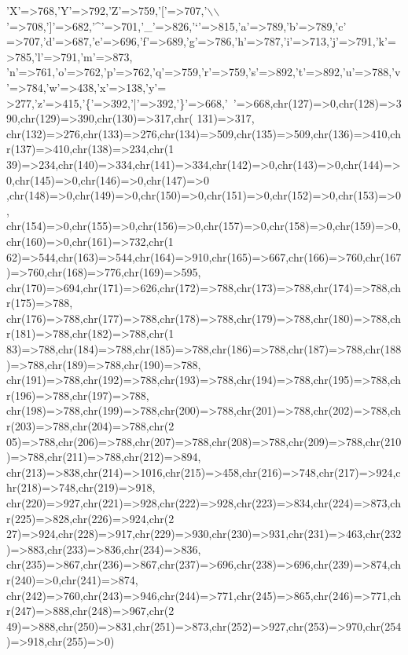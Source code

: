 \begin{DoxyCode}
    \textcolor{charliteral}{'X'}=>768,\textcolor{charliteral}{'Y'}=>792,\textcolor{charliteral}{'Z'}=>759,\textcolor{charliteral}{'['}=>707,\textcolor{charliteral}{'\(\backslash\)\(\backslash\)'}=>708,\textcolor{charliteral}{']'}=>682,\textcolor{charliteral}{'^'}=>701,\textcolor{charliteral}{'\_'}=>826,\textcolor{charliteral}{'`'}=>815,\textcolor{charliteral}{'a'}=>789,\textcolor{charliteral}{'b'}=>789,\textcolor{charliteral}{'c'}
      =>707,\textcolor{charliteral}{'d'}=>687,\textcolor{charliteral}{'e'}=>696,\textcolor{charliteral}{'f'}=>689,\textcolor{charliteral}{'g'}=>786,\textcolor{charliteral}{'h'}=>787,\textcolor{charliteral}{'i'}=>713,\textcolor{charliteral}{'j'}=>791,\textcolor{charliteral}{'k'}=>785,\textcolor{charliteral}{'l'}=>791,\textcolor{charliteral}{'m'}=>873,
    \textcolor{charliteral}{'n'}=>761,\textcolor{charliteral}{'o'}=>762,\textcolor{charliteral}{'p'}=>762,\textcolor{charliteral}{'q'}=>759,\textcolor{charliteral}{'r'}=>759,\textcolor{charliteral}{'s'}=>892,\textcolor{charliteral}{'t'}=>892,\textcolor{charliteral}{'u'}=>788,\textcolor{charliteral}{'v'}=>784,\textcolor{charliteral}{'w'}=>438,\textcolor{charliteral}{'x'}=>138,\textcolor{charliteral}{'y'}=
      >277,\textcolor{charliteral}{'z'}=>415,\textcolor{charliteral}{'\{'}=>392,\textcolor{charliteral}{'|'}=>392,\textcolor{charliteral}{'\}'}=>668,\textcolor{charliteral}{'~'}=>668,chr(127)=>0,chr(128)=>390,chr(129)=>390,chr(130)=>317,chr(
      131)=>317,
    chr(132)=>276,chr(133)=>276,chr(134)=>509,chr(135)=>509,chr(136)=>410,chr(137)=>410,chr(138)=>234,chr(1
      39)=>234,chr(140)=>334,chr(141)=>334,chr(142)=>0,chr(143)=>0,chr(144)=>0,chr(145)=>0,chr(146)=>0,chr(147)=>0
      ,chr(148)=>0,chr(149)=>0,chr(150)=>0,chr(151)=>0,chr(152)=>0,chr(153)=>0,
    chr(154)=>0,chr(155)=>0,chr(156)=>0,chr(157)=>0,chr(158)=>0,chr(159)=>0,chr(160)=>0,chr(161)=>732,chr(1
      62)=>544,chr(163)=>544,chr(164)=>910,chr(165)=>667,chr(166)=>760,chr(167)=>760,chr(168)=>776,chr(169)=>595,
      chr(170)=>694,chr(171)=>626,chr(172)=>788,chr(173)=>788,chr(174)=>788,chr(175)=>788,
    chr(176)=>788,chr(177)=>788,chr(178)=>788,chr(179)=>788,chr(180)=>788,chr(181)=>788,chr(182)=>788,chr(1
      83)=>788,chr(184)=>788,chr(185)=>788,chr(186)=>788,chr(187)=>788,chr(188)=>788,chr(189)=>788,chr(190)=>788,
      chr(191)=>788,chr(192)=>788,chr(193)=>788,chr(194)=>788,chr(195)=>788,chr(196)=>788,chr(197)=>788,
    chr(198)=>788,chr(199)=>788,chr(200)=>788,chr(201)=>788,chr(202)=>788,chr(203)=>788,chr(204)=>788,chr(2
      05)=>788,chr(206)=>788,chr(207)=>788,chr(208)=>788,chr(209)=>788,chr(210)=>788,chr(211)=>788,chr(212)=>894,
      chr(213)=>838,chr(214)=>1016,chr(215)=>458,chr(216)=>748,chr(217)=>924,chr(218)=>748,chr(219)=>918,
    chr(220)=>927,chr(221)=>928,chr(222)=>928,chr(223)=>834,chr(224)=>873,chr(225)=>828,chr(226)=>924,chr(2
      27)=>924,chr(228)=>917,chr(229)=>930,chr(230)=>931,chr(231)=>463,chr(232)=>883,chr(233)=>836,chr(234)=>836,
      chr(235)=>867,chr(236)=>867,chr(237)=>696,chr(238)=>696,chr(239)=>874,chr(240)=>0,chr(241)=>874,
    chr(242)=>760,chr(243)=>946,chr(244)=>771,chr(245)=>865,chr(246)=>771,chr(247)=>888,chr(248)=>967,chr(2
      49)=>888,chr(250)=>831,chr(251)=>873,chr(252)=>927,chr(253)=>970,chr(254)=>918,chr(255)=>0)
\end{DoxyCode}
